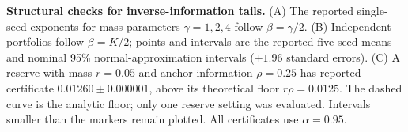 \textbf{Structural checks for inverse-information tails.}
(A) The reported single-seed exponents for mass parameters $\gamma=1,2,4$ follow $\beta=\gamma/2$. (B) Independent portfolios follow $\beta=K/2$; points and intervals are the reported five-seed means and nominal 95\% normal-approximation intervals ($\pm1.96$ standard errors). (C) A reserve with mass $r=0.05$ and anchor information $\rho=0.25$ has reported certificate $0.01260\pm0.000001$, above its theoretical floor $r\rho=0.0125$. The dashed curve is the analytic floor; only one reserve setting was evaluated. Intervals smaller than the markers remain plotted. All certificates use $\alpha=0.95$.
